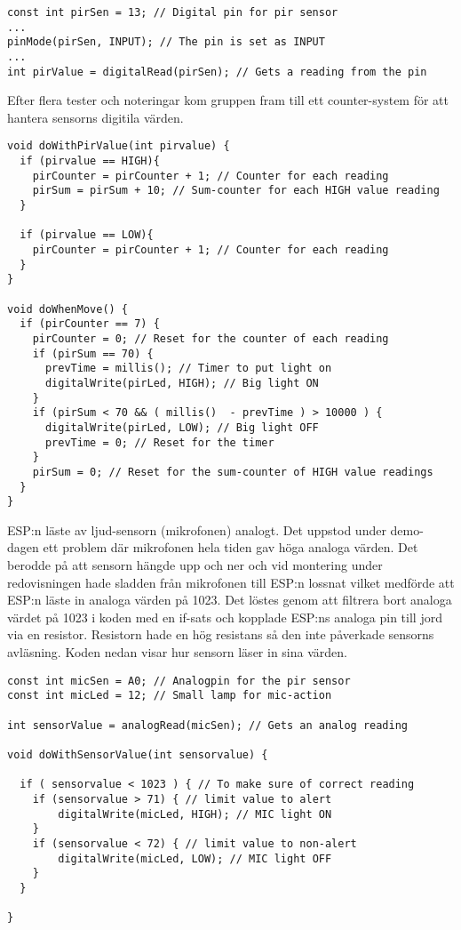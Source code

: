 \begin{lstlisting}
const int pirSen = 13; // Digital pin for pir sensor
...
pinMode(pirSen, INPUT); // The pin is set as INPUT
...
int pirValue = digitalRead(pirSen); // Gets a reading from the pin
\end{lstlisting}
Efter flera tester och noteringar kom gruppen fram till ett counter-system för att hantera sensorns digitila värden.
\begin{lstlisting}
void doWithPirValue(int pirvalue) {
  if (pirvalue == HIGH){
    pirCounter = pirCounter + 1; // Counter for each reading
    pirSum = pirSum + 10; // Sum-counter for each HIGH value reading
  }

  if (pirvalue == LOW){
    pirCounter = pirCounter + 1; // Counter for each reading
  }
}

void doWhenMove() {
  if (pirCounter == 7) {
    pirCounter = 0; // Reset for the counter of each reading
    if (pirSum == 70) {
      prevTime = millis(); // Timer to put light on
      digitalWrite(pirLed, HIGH); // Big light ON
    }
    if (pirSum < 70 && ( millis()  - prevTime ) > 10000 ) {
      digitalWrite(pirLed, LOW); // Big light OFF
      prevTime = 0; // Reset for the timer 
    }
    pirSum = 0; // Reset for the sum-counter of HIGH value readings
  }  
}
\end{lstlisting}
ESP:n läste av ljud-sensorn (mikrofonen) analogt. Det uppstod under demo-dagen ett problem där mikrofonen hela tiden gav höga analoga värden. Det berodde på att sensorn hängde upp och ner och vid montering under redovisningen hade sladden från mikrofonen till ESP:n lossnat vilket medförde att ESP:n läste in analoga värden på 1023. Det löstes genom att filtrera bort analoga värdet på 1023 i koden med en if-sats och kopplade ESP:ns analoga pin till jord via en resistor. Resistorn hade en hög resistans så den inte påverkade sensorns avläsning. Koden nedan visar hur sensorn läser in sina värden.

\begin{lstlisting}
const int micSen = A0; // Analogpin for the pir sensor 
const int micLed = 12; // Small lamp for mic-action

int sensorValue = analogRead(micSen); // Gets an analog reading

void doWithSensorValue(int sensorvalue) {
  
  if ( sensorvalue < 1023 ) { // To make sure of correct reading
    if (sensorvalue > 71) { // limit value to alert
        digitalWrite(micLed, HIGH); // MIC light ON
    }
    if (sensorvalue < 72) { // limit value to non-alert
        digitalWrite(micLed, LOW); // MIC light OFF
    }
  }
  
}
\end{lstlisting}

